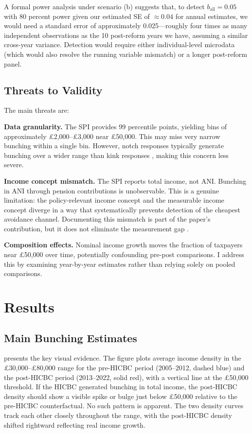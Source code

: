 \documentclass[12pt]{article}
\begin{document}
A formal power analysis under scenario (b) suggests that, to detect $b_{\text{all}} = 0.05$ with 80 percent power given our estimated SE of $\approx 0.04$ for annual estimates, we would need a standard error of approximately 0.025---roughly four times as many independent observations as the 10 post-reform years we have, assuming a similar cross-year variance. Detection would require either individual-level microdata (which would also resolve the running variable mismatch) or a longer post-reform panel.

\subsection{Threats to Validity}

The main threats are:

\textbf{Data granularity.} The SPI provides 99 percentile points, yielding bins of approximately \pounds2,000--\pounds3,000 near \pounds50,000. This may miss very narrow bunching within a single bin. However, notch responses typically generate bunching over a wider range than kink responses \citep{kleven2016}, making this concern less severe.

\textbf{Income concept mismatch.} The SPI reports total income, not ANI. Bunching in ANI through pension contributions is unobservable. This is a genuine limitation: the policy-relevant income concept and the measurable income concept diverge in a way that systematically prevents detection of the cheapest avoidance channel. Documenting this mismatch is part of the paper's contribution, but it does not eliminate the measurement gap \citep{saezslerodrz2012}.

\textbf{Composition effects.} Nominal income growth moves the fraction of taxpayers near \pounds50,000 over time, potentially confounding pre-post comparisons. I address this by examining year-by-year estimates rather than relying solely on pooled comparisons.


\section{Results}
\label{sec:results}

\subsection{Main Bunching Estimates}

 presents the key visual evidence. The figure plots average income density in the \pounds30,000--\pounds80,000 range for the pre-HICBC period (2005--2012, dashed blue) and the post-HICBC period (2013--2022, solid red), with a vertical line at the \pounds50,000 threshold. If the HICBC generated bunching in total income, the post-HICBC density should show a visible spike or bulge just below \pounds50,000 relative to the pre-HICBC counterfactual. No such pattern is apparent. The two density curves track each other closely throughout the range, with the post-HICBC density shifted rightward reflecting real income growth.
\end{document}
